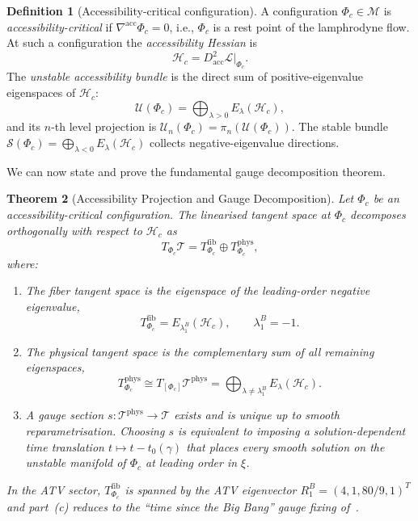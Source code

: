 \documentclass[12pt,a4paper]{article}
\theoremstyle{plain}
\newtheorem{theorem}{Theorem}[section]
\theoremstyle{definition}
\newtheorem{definition}[theorem]{Definition}
\theoremstyle{remark}
\newcommand{\Phic}{\Phi_c}
\newcommand{\Tacc}{\mathcal{T}}
\newcommand{\Uacc}{\mathcal{U}}
\newcommand{\Sacc}{\mathcal{S}}
\newcommand{\piproj}{\pi}
\newcommand{\Hacc}{\mathcal{H}}
\newcommand{\Lacc}{\mathcal{L}}
\newcommand{\nabacc}{\nabla^{\!\mathrm{acc}}}
\newcommand{\lBn}[1]{\lambda^B_{#1}}
\begin{document}
\begin{definition}[Accessibility-critical configuration]
\label{def:crit_config}
A configuration $\Phic\in\mathcal{M}$ is \emph{accessibility-critical} if
$\nabacc\Phic = 0$, i.e., $\Phic$ is a rest point of the lamphrodyne flow. At
such a configuration the \emph{accessibility Hessian} is
\begin{equation}
  \Hacc_c = D^2_{\mathrm{acc}}\Lacc\big|_{\Phic}.
  \label{eq:acc_hessian}
\end{equation}
The \emph{unstable accessibility bundle} is the direct sum of positive-eigenvalue
eigenspaces of $\Hacc_c$:
\begin{equation}
  \Uacc(\Phic) = \bigoplus_{\lambda>0} E_\lambda(\Hacc_c),
  \label{eq:unstable_bundle}
\end{equation}
and its $n$-th level projection is $\Uacc_n(\Phic) = \piproj_n(\Uacc(\Phic))$.
The stable bundle $\Sacc(\Phic) = \bigoplus_{\lambda<0} E_\lambda(\Hacc_c)$
collects negative-eigenvalue directions.
\end{definition}

We can now state and prove the fundamental gauge decomposition theorem.

\begin{theorem}[Accessibility Projection and Gauge Decomposition]
\label{thm:A}
Let $\Phic$ be an accessibility-critical configuration. The linearised tangent space
at $\Phic$ decomposes orthogonally with respect to $\Hacc_c$ as
\begin{equation}
  T_{\Phic}\Tacc
  = T^{\mathrm{fib}}_{\Phic} \oplus T^{\mathrm{phys}}_{\Phic},
  \label{eq:tangent_decomp}
\end{equation}
where:
\begin{enumerate}[label=\textup{(\alph*)}]
  \item The \emph{fiber tangent space} is the eigenspace of the leading-order
    negative eigenvalue,
    \begin{equation}
      T^{\mathrm{fib}}_{\Phic} = E_{\lBn{1}}(\Hacc_c),
      \qquad \lBn{1} = -1.
      \label{eq:fiber_eigenspace}
    \end{equation}
  \item The \emph{physical tangent space} is the complementary sum of all
    remaining eigenspaces,
    \begin{equation}
      T^{\mathrm{phys}}_{\Phic}
      \cong T_{[\Phic]}\Tacc^{\mathrm{phys}}
      = \bigoplus_{\lambda \neq \lBn{1}} E_\lambda(\Hacc_c).
      \label{eq:phys_eigenspaces}
    \end{equation}
  \item A gauge section $s:\Tacc^{\mathrm{phys}}\to\Tacc$ exists and is unique
    up to smooth reparametrisation. Choosing $s$ is equivalent to imposing a
    solution-dependent time translation $t\mapsto t - t_0(\gamma)$ that places
    every smooth solution on the unstable manifold of $\Phic$ at leading order in $\xi$.
\end{enumerate}
In the ATV sector, $T^{\mathrm{fib}}_{\Phic}$ is spanned by the ATV eigenvector
$R_1^B = (4,1,80/9,1)^T$ and part~\textup{(c)} reduces to the
``time since the Big Bang'' gauge fixing of~\cite{ATV2026}.
\end{theorem}
\end{document}
